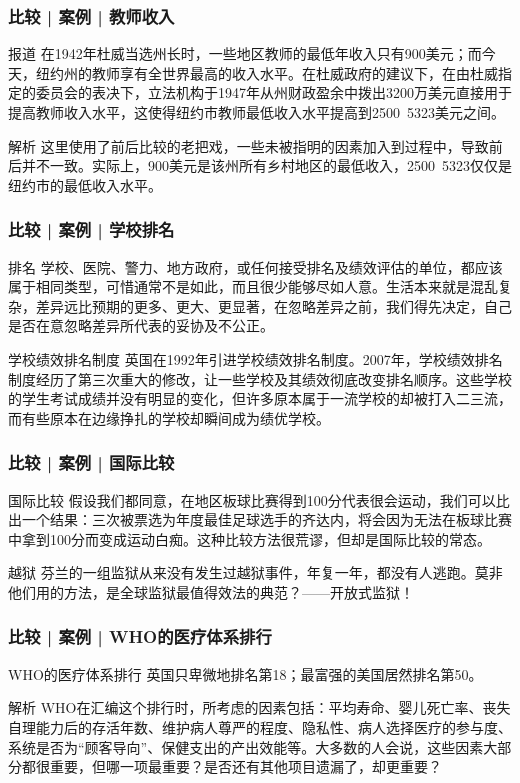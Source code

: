 \begin{frame}
  \frametitle{比较 | 案例 | 教师收入}
  \begin{block}{报道}
    在1942年杜威当选州长时，一些地区教师的最低年收入只有900美元；而今天，纽约州的教师享有全世界最高的收入水平。在杜威政府的建议下，在由杜威指定的委员会的表决下，立法机构于1947年从州财政盈余中拨出3200万美元直接用于提高教师收入水平，这使得纽约市教师最低收入水平提高到2500~5323美元之间。
  \end{block}
  \pause
  \begin{block}{解析}
    这里使用了前后比较的老把戏，一些未被指明的因素加入到过程中，导致前后并不一致。实际上，900美元是该州所有乡村地区的最低收入，2500~5323仅仅是纽约市的最低收入水平。
  \end{block}
\end{frame}

\begin{frame}
  \frametitle{比较 | 案例 | 学校排名}
  \begin{block}{排名}
    学校、医院、警力、地方政府，或任何接受排名及绩效评估的单位，都应该属于相同类型，可惜通常不是如此，而且很少能够尽如人意。生活本来就是混乱复杂，差异远比预期的更多、更大、更显著，在忽略差异之前，我们得先决定，自己是否在意忽略差异所代表的妥协及不公正。
  \end{block}
  \pause
  \begin{block}{学校绩效排名制度}
    英国在1992年引进学校绩效排名制度。2007年，学校绩效排名制度经历了第三次重大的修改，让一些学校及其绩效彻底改变排名顺序。这些学校的学生考试成绩并没有明显的变化，但许多原本属于一流学校的却被打入二三流，而有些原本在边缘挣扎的学校却瞬间成为绩优学校。
  \end{block}
\end{frame}

\begin{frame}
  \frametitle{比较 | 案例 | 国际比较}
  \begin{block}{国际比较}
  假设我们都同意，在地区板球比赛得到100分代表很会运动，我们可以比出一个结果：三次被票选为年度最佳足球选手的齐达内，将会因为无法在板球比赛中拿到100分而变成运动白痴。这种比较方法很荒谬，但却是国际比较的常态。
  \end{block}
  \pause
  \begin{block}{越狱}
    芬兰的一组监狱从来没有发生过越狱事件，年复一年，都没有人逃跑。莫非他们用的方法，是全球监狱最值得效法的典范？——开放式监狱！
  \end{block}
\end{frame}

\begin{frame}
  \frametitle{比较 | 案例 | WHO的医疗体系排行}
  \begin{block}{WHO的医疗体系排行}
    英国只卑微地排名第18；最富强的美国居然排名第50。
  \end{block}
  \pause
  \begin{block}{解析}
    WHO在汇编这个排行时，所考虑的因素包括：平均寿命、婴儿死亡率、丧失自理能力后的存活年数、维护病人尊严的程度、隐私性、病人选择医疗的参与度、系统是否为“顾客导向”、保健支出的产出效能等。大多数的人会说，这些因素大部分都很重要，但哪一项最重要？是否还有其他项目遗漏了，却更重要？
  \end{block}
\end{frame}

